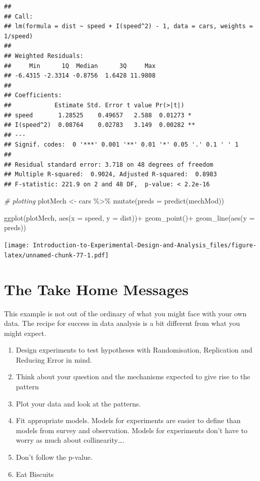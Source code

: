 \documentclass[
]{book}
\newenvironment{Shaded}{\begin{snugshade}}{\end{snugshade}}
\newcommand{\AttributeTok}[1]{\textcolor[rgb]{0.77,0.63,0.00}{#1}}
\newcommand{\CommentTok}[1]{\textcolor[rgb]{0.56,0.35,0.01}{\textit{#1}}}
\newcommand{\FunctionTok}[1]{\textcolor[rgb]{0.00,0.00,0.00}{#1}}
\newcommand{\NormalTok}[1]{#1}
\newcommand{\OtherTok}[1]{\textcolor[rgb]{0.56,0.35,0.01}{#1}}
\newcommand{\SpecialCharTok}[1]{\textcolor[rgb]{0.00,0.00,0.00}{#1}}
\providecommand{\tightlist}{%
  \setlength{\itemsep}{0pt}\setlength{\parskip}{0pt}}
\begin{document}
\begin{verbatim}
## 
## Call:
## lm(formula = dist ~ speed + I(speed^2) - 1, data = cars, weights = 1/speed)
## 
## Weighted Residuals:
##     Min      1Q  Median      3Q     Max 
## -6.4315 -2.3314 -0.8756  1.6428 11.9808 
## 
## Coefficients:
##            Estimate Std. Error t value Pr(>|t|)   
## speed       1.28525    0.49657   2.588  0.01273 * 
## I(speed^2)  0.08764    0.02783   3.149  0.00282 **
## ---
## Signif. codes:  0 '***' 0.001 '**' 0.01 '*' 0.05 '.' 0.1 ' ' 1
## 
## Residual standard error: 3.718 on 48 degrees of freedom
## Multiple R-squared:  0.9024, Adjusted R-squared:  0.8983 
## F-statistic: 221.9 on 2 and 48 DF,  p-value: < 2.2e-16
\end{verbatim}

\begin{Shaded}
\begin{Highlighting}[]
\CommentTok{\# plotting}
\NormalTok{plotMech }\OtherTok{\textless{}{-}}\NormalTok{ cars }\SpecialCharTok{\%\textgreater{}\%} 
  \FunctionTok{mutate}\NormalTok{(}\AttributeTok{preds =} \FunctionTok{predict}\NormalTok{(mechMod))}

\FunctionTok{ggplot}\NormalTok{(plotMech, }\FunctionTok{aes}\NormalTok{(}\AttributeTok{x =}\NormalTok{ speed, }\AttributeTok{y =}\NormalTok{ dist))}\SpecialCharTok{+}
  \FunctionTok{geom\_point}\NormalTok{()}\SpecialCharTok{+}
  \FunctionTok{geom\_line}\NormalTok{(}\FunctionTok{aes}\NormalTok{(}\AttributeTok{y =}\NormalTok{ preds))}
\end{Highlighting}
\end{Shaded}

\texttt{[image: Introduction-to-Experimental-Design-and-Analysis\_files/figure-latex/unnamed-chunk-77-1.pdf]}

\hypertarget{the-take-home-messages}{%
\section{The Take Home Messages}\label{the-take-home-messages}}

This example is not out of the ordinary of what you might face with your own data. The recipe for success in data analysis is a bit different from what you might expect.

\begin{enumerate}
\def\labelenumi{\arabic{enumi}.}
\tightlist
\item
  Design experiments to test hypotheses with Randomisation, Replication and Reducing Error in mind.
\item
  Think about your question and the mechanisms expected to give rise to the pattern
\item
  Plot your data and look at the patterns.
\item
  Fit appropriate models. Models for experiments are easier to define than models from survey and observation. Models for experiments don't have to worry as much about collinearity\ldots.
\item
  Don't follow the p-value.
\item
  Eat Biscuits
\end{enumerate}
\end{document}
